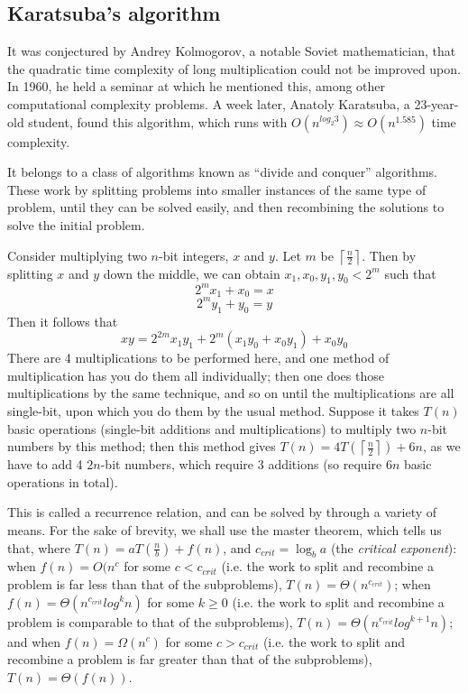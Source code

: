 \documentclass[10pt,a4paper]{article}
\begin{document}
\begin{multicols}{2}
	\section{Karatsuba's algorithm}
	
	It was conjectured by Andrey Kolmogorov, a notable Soviet mathematician, that the quadratic time complexity of long multiplication could not be improved upon. In 1960, he held a seminar at which he mentioned this, among other computational complexity problems. A week later, Anatoly Karatsuba, a 23-year-old student, found this algorithm, which runs with \(O(n^{log_{2}3})\approx{}O(n^{1.585})\) time complexity.
	
	It belongs to a class of algorithms known as ``divide and conquer'' algorithms. These work by splitting problems into smaller instances of the same type of problem, until they can be solved easily, and then recombining the solutions to solve the initial problem.
	
	Consider multiplying two \(n\)-bit integers, \(x\) and \(y\). Let \(m\) be \(\left\lceil\frac{n}{2}\right\rceil\). Then by splitting \(x\) and \(y\) down the middle, we can obtain \(x_1,x_0,y_1,y_0<2^m\) such that \[2^{m}x_1+x_0=x\]\[2^{m}y_1+y_0=y\]
	Then it follows that \[xy=2^{2m}x_1y_1+2^m(x_1y_0+x_0y_1)+x_0y_0\]
	There are 4 multiplications to be performed here, and one method of multiplication has you do them all individually; then one does those multiplications by the same technique, and so on until the multiplications are all single-bit, upon which you do them by the usual method. Suppose it takes \(T(n)\) basic operations (single-bit additions and multiplications) to multiply two \(n\)-bit numbers by this method; then this method gives \(T(n)=4T(\left\lceil{}\frac{n}{2}\right\rceil{})+6n\), as we have to add 4 \(2n\)-bit numbers, which require 3 additions (so require \(6n\) basic operations in total).
	
	This is called a recurrence relation, and can be solved by through a variety of means. For the sake of brevity, we shall use the master theorem, which tells us that, where \(T(n)=aT(\frac{n}{b})+f(n)\), and \(c_{crit}=\log_ba\) (the \textit{critical exponent}): when \(f(n)=O(n^c\) for some \(c<c_{crit}\) (i.e. the work to split and recombine a problem is far less than that of the subproblems), \(T(n)=\Theta(n^{c_{crit}})\); when \(f(n)=\Theta(n^{c_{crit}}log^kn)\) for some \(k\geq0\) (i.e. the work to split and recombine a problem is comparable to that of the subproblems), \(T(n)=\Theta(n^{c_{crit}}log^{k+1}n)\); and when \(f(n)=\Omega(n^c)\) for some \(c>c_{crit}\) (i.e. the work to split and recombine a problem is far greater than that of the subproblems), \(T(n)=\Theta(f(n))\).
	

\end{multicols}
\end{document}
